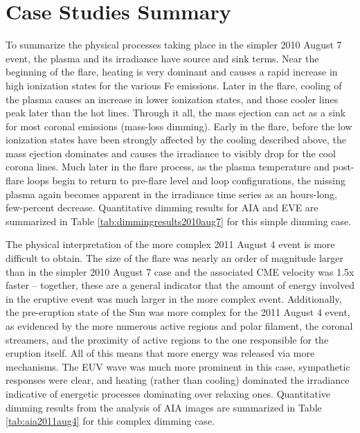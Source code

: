 \section{Case Studies Summary}
To summarize the physical processes taking place in the simpler 2010 August 7 event, the plasma and its irradiance have source and sink terms. Near the beginning of the flare, heating is very dominant and causes a rapid increase in high ionization states for the various Fe emissions. Later in the flare, cooling of the plasma causes an increase in lower ionization states, and those cooler lines peak later than the hot lines. Through it all, the mass ejection can act as a sink  for most coronal emissions (mass-loss dimming). Early in the flare, before the low ionization states have been strongly affected by the cooling described above, the mass ejection dominates and causes the irradiance to visibly drop for the cool corona lines. Much later in the flare process, as the plasma temperature and post-flare loops begin to return to pre-flare level and loop configurations, the missing plasma again becomes apparent in the irradiance time series as an hours-long, few-percent decrease. Quantitative dimming results for AIA and EVE are summarized in Table \ref{tab:dimmingresults2010aug7} for this simple dimming case. 

The physical interpretation of the more complex 2011 August 4 event is more difficult to obtain. The size of the flare was nearly an order of magnitude larger than in the simpler 2010 August 7 case and the associated CME velocity was 1.5x faster -- together, these are a general indicator that the amount of energy involved in the eruptive event was much larger in the more complex event. Additionally, the pre-eruption state of the Sun was more complex for the 2011 August 4 event, as evidenced by the more numerous active regions and polar filament, the coronal streamers, and the proximity of active regions to the one responsible for the eruption itself. All of this means that more energy was released via more mechanisms. The EUV wave was much more prominent in this case, sympathetic responses were clear, and heating (rather than cooling) dominated the irradiance indicative of energetic processes dominating over relaxing ones. Quantitative dimming results from the analysis of AIA images are summarized in Table \ref{tab:aia2011aug4} for this complex dimming case. 